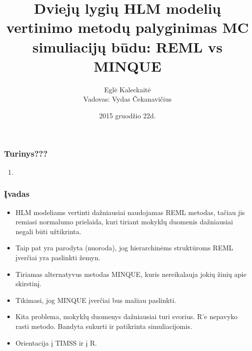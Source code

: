 \documentclass[utf8,hyperref={unicode,pdftex}]{beamer}
\title[\hspace{130pt} p. \insertpagenumber\enspace iš \insertdocumentendpage\enspace ]{Dviejų lygių HLM modelių vertinimo metodų palyginimas MC simuliacijų būdu: REML vs MINQUE}
\author[ E. Kaleckaitė]{Eglė Kaleckaitė\\
Vadovas: Vydas Čekanavičius}
\institute{Vilniaus Universitetas, Matematikos ir Informatikos Fakultetas}
\date{2015 gruodžio 22d.}
\begin{document}
\begin{frame}
\titlepage
\end{frame}
\begin{frame}
\frametitle{Turinys???}
\Large
\begin{enumerate}
\item 
\end{enumerate}
\end{frame}
\begin{frame}
\frametitle{Įvadas}
\begin{itemize}
\item HLM modeliams vertinti dažniausiai naudojamas REML metodas, tačiau jis remiasi normalumo prielaida, kuri tiriant mokyklų duomenis dažniausiai negali būti užtikrinta.
\item Taip pat yra parodyta (nuoroda), jog hierarchinėms struktūroms REML įverčiai yra paslinkti žemyn.
\item Tiriamas alternatyvus metodas MINQUE, kuris nereikalauja jokių žinių apie skirstinį.
\item Tikimasi, jog MINQUE įverčiai bus mažiau paslinkti.
\item Kita problema, mokyklų duomenys dažniausiai turi svorius. R'e nepavyko rasti metodo. Bandyta sukurti ir patikrinta simuliacijomis.
\item Orientacija į TIMSS ir į R.
\end{itemize}
\end{frame}
\end{document}
